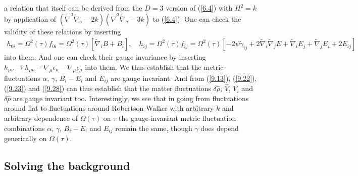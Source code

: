 \documentclass[aps,onecolumn,10pt]{revtex4}
\numberwithin{equation}{section}
\numberwithin{equation}{section}
\begin{document}
%
a relation that itself can be  derived from the $D=3$ version of (\ref{6.4}) with $H^2=k$ by application  of $(\tilde{\nabla}^a\tilde{\nabla}_a-2k)(\tilde{\nabla}^a\tilde{\nabla}_a-3k)$ to (\ref{6.4}). One can check the validity of these relations by inserting 
%
\begin{align}
h_{0i}=\Omega^2(\tau)f_{0i}=\Omega^2(\tau)[\tilde{\nabla}_iB+B_i],\quad h_{ij}=\Omega^2(\tau)f_{ij}=\Omega^2(\tau)[-2\psi\tilde{\gamma}_{ij} +2\tilde{\nabla}_i\tilde{\nabla}_j E + \tilde{\nabla}_i E_j + \tilde{\nabla}_j E_i + 2E_{ij}]
\label{9.48a}
\end{align}
%
into them. And one can check their gauge invariance by inserting $h_{\mu\nu}\rightarrow h_{\mu\nu}-\nabla_{\mu}\epsilon_{\nu}-\nabla_{\mu}\epsilon_{\mu}$ into them. We thus establish that the metric fluctuations $\alpha$, $\gamma$, $B_i-\dot{E}_i$ and $E_{ij}$ are gauge invariant. And from  (\ref{9.13}), (\ref{9.22}), (\ref{9.23}) and (\ref{9.28}) can thus establish that the matter fluctuations $\delta \hat{\rho}$, $\hat{V}$, $V_i$ and $\delta \hat{p}$ are gauge invariant too. Interestingly, we see that in going from fluctuations around flat to fluctuations around Robertson-Walker with arbitrary $k$ and arbitrary dependence of $\Omega(\tau)$ on $\tau$ the gauge-invariant metric fluctuation combinations $\alpha$, $\gamma$, $B_i-\dot{E}_i$ and $E_{ij}$  remain the same, though $\gamma$ does depend generically on $\Omega(\tau)$. 


\subsection{Solving the background}
\end{document}
